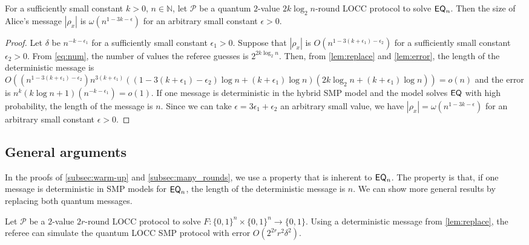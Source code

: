 \begin{theorem}\label{thm:two-way_LOCC}
    For a sufficiently small constant $k>0$, $n \in\mathbb{N}$, let $\mathcal{P}$ be a quantum $2$-value $2k \log_2 n$-round LOCC protocol to solve $\mathsf{EQ}_n$. Then the size of Alice's message $|\rho_x|$ is $\omega(n^{1-3k-\epsilon})$ for an arbitrary small constant $\epsilon >0$.
\end{theorem}

\begin{proof}
    Let $\delta$ be $n^{-k-\epsilon_1}$ for a sufficiently small constant $\epsilon_1 >0$. Suppose that $|\rho_x|$ is $O(n^{1-3(k+\epsilon_1)-\epsilon_2})$ for a sufficiently small constant $\epsilon_2 >0$. From \cref{eq:num}, the number of values the referee guesses is $2^{2 k \log_2 n}$. Then, from \cref{lem:replace} and \cref{lem:error}, the length of the deterministic message is $O ( (n^{1-3(k+\epsilon_1)-\epsilon_2}) n^{3(k+\epsilon_1)} ((1-3(k+\epsilon_1)-\epsilon_2)\log n + (k+\epsilon_1) \log n) (2 k \log_2 n + (k+\epsilon_1)\log n) )= o(n)$ and the error is $n^k (k \log n + 1) (n^{-k-\epsilon_1}) = o(1)$. If one message is deterministic in the hybrid SMP model and the model solves $\mathsf{EQ}$ with high probability, the length of the message is $n$. Since we can take $\epsilon = 3\epsilon_1+\epsilon_2$ an arbitrary small value, we have $|\rho_x| = \omega(n^{1-3k-\epsilon})$ for an arbitrary small constant $\epsilon>0$.
\end{proof}

\subsection{General arguments}

In the proofs of \cref{subsec:warm-up} and \cref{subsec:many_rounds}, we use a property that is inherent to $\mathsf{EQ}_n$. The property is that, if one message is deterministic in SMP models for $\mathsf{EQ}_n$, the length of the deterministic message is $n$. We can show more general results by replacing both quantum messages.

\begin{lemma}\label{lem:error_replace_both}
    Let $\mathcal{P}$ be a $2$-value $2r$-round LOCC protocol to solve $F:\{0,1\}^n \times \{0,1\}^n \rightarrow \{0,1\}$. Using a deterministic message from \cref{lem:replace}, the referee can simulate the quantum LOCC SMP protocol with error $O(2^{2r}r^2\delta^2)$.
\end{lemma}

